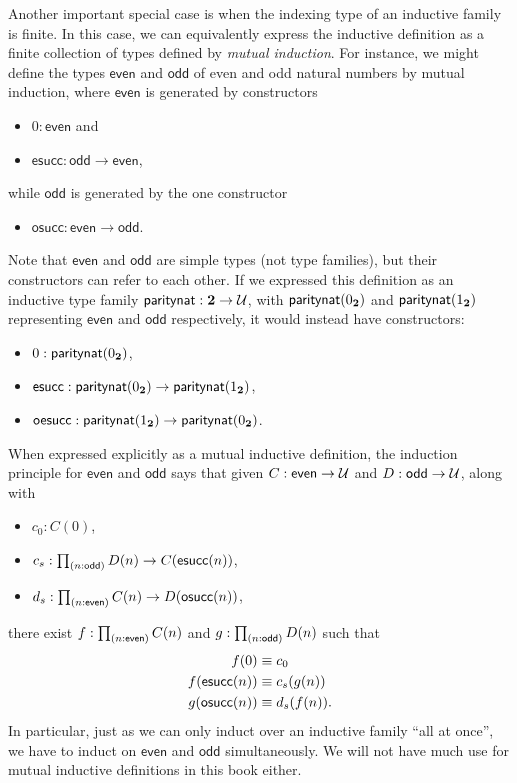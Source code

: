 %
%
Another important special case is when the indexing type of an inductive family is finite.
In this case, we can equivalently express the inductive definition as a finite collection of types defined by \emph{mutual induction}.
For instance, we might define the types $\mathsf{even}$ and $\mathsf{odd}$ of even and odd natural numbers by mutual induction, where $\mathsf{even}$ is generated by constructors
\begin{itemize}
\item $0:\mathsf{even}$ and
\item $\mathsf{esucc} : \mathsf{odd}\to\mathsf{even}$,
\end{itemize}
while $\mathsf{odd}$ is generated by the one constructor
\begin{itemize}
\item $\mathsf{osucc} : \mathsf{even}\to \mathsf{odd}$.
\end{itemize}
Note that $\mathsf{even}$ and $\mathsf{odd}$ are simple types (not type families), but their constructors can refer to each other.
If we expressed this definition as an inductive type family $\mathsf{paritynat} : \mathbf{2} \to \mathcal{U}$, with $\mathsf{paritynat}({0_{\mathbf{2}}})$ and $\mathsf{paritynat}({1_{\mathbf{2}}})$ representing $\mathsf{even}$ and $\mathsf{odd}$ respectively, it would instead have constructors:
\begin{itemize}
\item $0 : \mathsf{paritynat}({0_{\mathbf{2}}})$,
\item $\mathsf{esucc} : \mathsf{paritynat}({0_{\mathbf{2}}}) \to \mathsf{paritynat}({1_{\mathbf{2}}})$,
\item $\mathsf{oesucc} : \mathsf{paritynat}({1_{\mathbf{2}}}) \to \mathsf{paritynat}({0_{\mathbf{2}}})$.
\end{itemize}
When expressed explicitly as a mutual inductive definition, the induction principle for $\mathsf{even}$ and $\mathsf{odd}$ says that given $C:\mathsf{even}\to\mathcal{U}$ and $D:\mathsf{odd}\to\mathcal{U}$, along with
\begin{itemize}
\item $c_0 : C(0)$,
\item $c_s : \prd{n:\mathsf{odd}} D(n) \to C(\mathsf{esucc}(n))$,
\item $d_s : \prd{n:\mathsf{even}} C(n) \to D(\mathsf{osucc}(n))$,
\end{itemize}
there exist $f:\prd{n:\mathsf{even}} C(n)$ and $g:\prd{n:\mathsf{odd}}D(n)$ such that
\begin{align*}
  f(0) &\equiv c_0\\
  f(\mathsf{esucc}(n)) &\equiv c_s(g(n))\\
  g(\mathsf{osucc}(n)) &\equiv d_s(f(n)).
\end{align*}
In particular, just as we can only induct over an inductive family ``all at once'', we have to induct on $\mathsf{even}$ and $\mathsf{odd}$ simultaneously.
We will not have much use for mutual inductive definitions in this book either.

